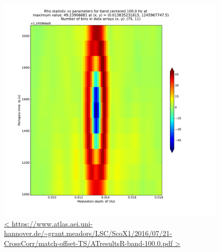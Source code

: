 \documentclass{article}
\begin{document}
\begin{figure}
\begin{center}
\includegraphics[trim= 0 0 0 0, clip, width=0.80\paperwidth,keepaspectratio]{plots/match-offset-TS/ATresultsR-band-100-0.pdf}
\caption{
\url{<
https://www.atlas.aei.uni-hannover.de/~grant.meadors/LSC/ScoX1/2016/07/21-CrossCorr/match-offset-TS/ATresultsR-band-100.0.pdf
>}
}
\label{AToffsetGraph}
\end{center}
\end{figure}
\end{document}
